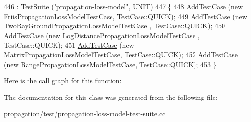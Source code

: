 \begin{DoxyCode}
446   : \hyperlink{classns3_1_1TestSuite_a904b0c40583b744d30908aeb94636d1a}{TestSuite} (\textcolor{stringliteral}{"propagation-loss-model"}, \hyperlink{classns3_1_1TestSuite_a1ebfcab34ec8161e085e8e3a1855eae0a3885375a3787abf60431f8454b3cadbd}{UNIT})
447 \{
448   \hyperlink{classns3_1_1TestCase_a3718088e3eefd5d6454569d2e0ddd835}{AddTestCase} (\textcolor{keyword}{new} \hyperlink{classFriisPropagationLossModelTestCase}{FriisPropagationLossModelTestCase}, 
      TestCase::QUICK);
449   \hyperlink{classns3_1_1TestCase_a3718088e3eefd5d6454569d2e0ddd835}{AddTestCase} (\textcolor{keyword}{new} \hyperlink{classTwoRayGroundPropagationLossModelTestCase}{TwoRayGroundPropagationLossModelTestCase}
      , TestCase::QUICK);
450   \hyperlink{classns3_1_1TestCase_a3718088e3eefd5d6454569d2e0ddd835}{AddTestCase} (\textcolor{keyword}{new} \hyperlink{classLogDistancePropagationLossModelTestCase}{LogDistancePropagationLossModelTestCase}
      , TestCase::QUICK);
451   \hyperlink{classns3_1_1TestCase_a3718088e3eefd5d6454569d2e0ddd835}{AddTestCase} (\textcolor{keyword}{new} \hyperlink{classMatrixPropagationLossModelTestCase}{MatrixPropagationLossModelTestCase}, 
      TestCase::QUICK);
452   \hyperlink{classns3_1_1TestCase_a3718088e3eefd5d6454569d2e0ddd835}{AddTestCase} (\textcolor{keyword}{new} \hyperlink{classRangePropagationLossModelTestCase}{RangePropagationLossModelTestCase}, 
      TestCase::QUICK);
453 \}
\end{DoxyCode}


Here is the call graph for this function\+:




The documentation for this class was generated from the following file\+:\begin{DoxyCompactItemize}
\item 
propagation/test/\hyperlink{propagation-loss-model-test-suite_8cc}{propagation-\/loss-\/model-\/test-\/suite.\+cc}\end{DoxyCompactItemize}
